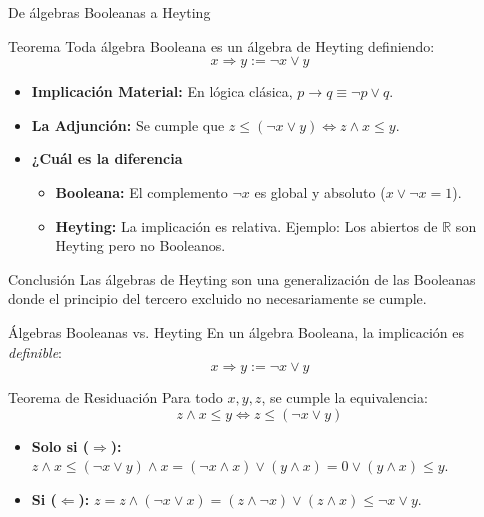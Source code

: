 \documentclass{beamer}
\begin{document}
\begin{frame}{De álgebras Booleanas a Heyting}
    \begin{block}{Teorema}
    Toda álgebra Booleana es un álgebra de Heyting definiendo:
    \[ x \Rightarrow y := \neg x \vee y \]
    \end{block}

    \begin{itemize}
        \item \textbf{Implicación Material:} En lógica clásica, $p \to q \equiv \neg p \vee q$.
        \item \textbf{La Adjunción:} Se cumple que $z \leq (\neg x \vee y) \iff z \wedge x \leq y$.
        \item \textbf{¿Cuál es la diferencia}
        \begin{itemize}
            \item \textbf{Booleana:} El complemento $\neg x$ es global y absoluto ($x \vee \neg x = 1$).
            \item \textbf{Heyting:} La implicación es relativa. Ejemplo: Los abiertos de $\mathbb{R}$ son Heyting pero no Booleanos.
        \end{itemize}
    \end{itemize}
    
    \begin{exampleblock}{Conclusión}
        Las álgebras de Heyting son una generalización de las Booleanas donde el principio del tercero excluido no necesariamente se cumple.
    \end{exampleblock}
\end{frame}

\begin{frame}{Álgebras Booleanas vs. Heyting}
    En un álgebra Booleana, la implicación es \textit{definible}:
    \[ x \Rightarrow y := \neg x \vee y \]
    
    \begin{block}{Teorema de Residuación}
    Para todo $x, y, z$, se cumple la equivalencia:
    \[ z \wedge x \leq y \iff z \leq (\neg x \vee y) \]
    \end{block}

    \begin{itemize}
        \item \textbf{Solo si ($\Rightarrow$):} $z \wedge x \leq (\neg x \vee y) \wedge x = ( \neg x \wedge x) \vee (y \wedge x) = 0 \vee (y \wedge x) \leq y$.
        \item \textbf{Si ($\Leftarrow$):} $z = z \wedge (\neg x \vee x) = (z \wedge \neg x) \vee (z \wedge x) \leq \neg x \vee y$.
    \end{itemize}
\end{frame}
\end{document}
